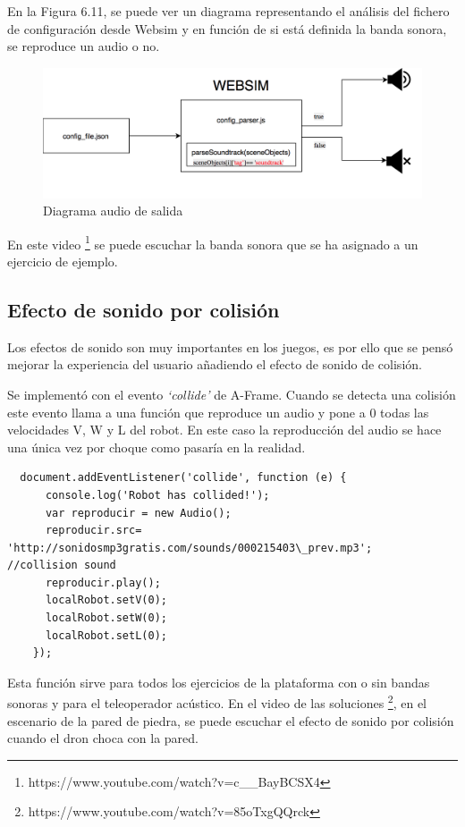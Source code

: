En la Figura 6.11, se puede ver un diagrama representando el análisis del fichero de configuración desde Websim y en función de si está definida la banda sonora, se reproduce un audio o no. 
\begin{figure}[H]
    \centering
    \includegraphics[width=1\textwidth, height=0.25\textwidth]{chapters/images/diagramaaudioout.png}
    \caption{Diagrama audio de salida}
    \label{fig:my_label}
\end{figure}

En este video \footnote{https://www.youtube.com/watch?v=c\_\_BayBCSX4} se puede escuchar la banda sonora que se ha asignado a un ejercicio de ejemplo.

\subsection{Efecto de sonido por colisión }

Los efectos de sonido son muy importantes en los juegos, es por ello que se pensó mejorar la experiencia del usuario añadiendo el efecto de sonido de colisión. 

Se implementó con el evento \textit{`collide'} de A-Frame. Cuando se detecta una colisión este evento llama a una función que reproduce un audio y pone a 0 todas las velocidades V, W y L del robot.  En este caso la reproducción del audio se hace una única vez por choque como pasaría en la realidad.

\begin{lstlisting}
  document.addEventListener('collide', function (e) {
      console.log('Robot has collided!');
      var reproducir = new Audio();
      reproducir.src= 'http://sonidosmp3gratis.com/sounds/000215403\_prev.mp3';   //collision sound
      reproducir.play();
      localRobot.setV(0);
      localRobot.setW(0);
      localRobot.setL(0);
	});
\end{lstlisting}

Esta función sirve para todos los ejercicios de la plataforma con o sin  bandas sonoras y para el teleoperador acústico. En el video de las soluciones  \footnote{https://www.youtube.com/watch?v=85oTxgQQrck},  en el escenario de la pared de piedra, se puede escuchar el efecto de sonido por colisión cuando el dron choca con la pared.